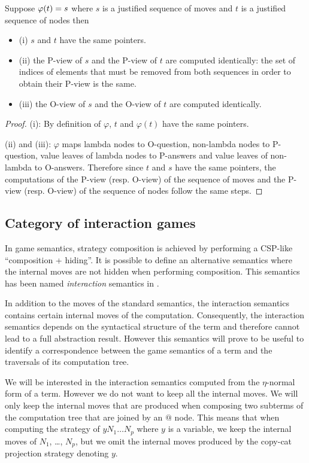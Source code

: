 \begin{property}
\label{proper:phi_pview} Suppose $\varphi(t) = s$ where $s$ is a
justified sequence of moves and $t$ is a justified sequence of nodes
then
\begin{itemize}
\item (i) $s$ and $t$ have the same pointers.
\item (ii) the P-view of $s$ and the P-view of $t$ are computed
identically: the set of indices of elements that must be removed
from both sequences in order to obtain their P-view is the same.
\item (iii) the O-view of $s$ and the O-view of $t$ are computed identically.
\end{itemize}
\end{property}
\begin{proof}
(i): By definition of $\varphi$, $t$ and $\varphi(t)$ have the same
pointers.

(ii) and (iii): $\varphi$ maps lambda nodes to O-question,
non-lambda nodes to P-question, value leaves of lambda nodes to P-answers and
value leaves of non-lambda to O-answers. Therefore since $t$ and $s$ have the
same pointers, the computations of the P-view (resp. O-view) of the
sequence of moves and the P-view (resp. O-view) of the sequence of
nodes follow the same steps.
\end{proof}


\subsection{Category of interaction games}

In game semantics, strategy composition is achieved by performing a CSP-like ``composition + hiding''.
It is possible to define an alternative semantics where the internal moves are not hidden when performing composition.
This semantics has been named \emph{interaction} semantics in \cite{DBLP:conf/sas/DimovskiGL05}.

In addition to the moves of the standard semantics, the interaction semantics contains certain
internal moves of the computation.
Consequently, the interaction semantics depends on the syntactical structure of the term and therefore cannot
lead to a full abstraction result. However this semantics will prove to be useful to identify
a correspondence between the game semantics
of a term and the traversals of its computation tree.

We will be interested in the interaction semantics computed from the
$\eta$-normal form of a term. However we do not want to keep all the internal moves. We will only keep the internal
moves that are produced when composing two subterms of the computation tree that are joined by an $@$ node.
This means that when computing the strategy of
$y N_1 \ldots N_p$ where $y$ is a variable, we keep the internal moves of $N_1$, \ldots, $N_p$, but
we omit the internal moves produced by the copy-cat projection strategy denoting $y$.

